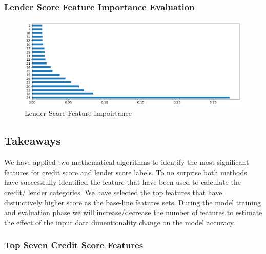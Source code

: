 \hypertarget{lender-score-feature-importance-evaluation}{%
\subsubsection{Lender Score Feature Importance
Evaluation}\label{lender-score-feature-importance-evaluation}}

\begin{Schunk}
\begin{figure}[H]

{\centering \includegraphics[width=1\linewidth]{../../artifacts/lfimportance} 

}

\caption[Lender Score Feature Impoirtance]{Lender Score Feature Impoirtance}\label{fig:lfi}
\end{figure}
\end{Schunk}

\hypertarget{takeaways}{%
\subsection{Takeaways}\label{takeaways}}

We have applied two mathematical algorithms to identify the most
significant features for credit score and lender score labels. To no
surprise both methods have successfully identified the feature that have
been used to calculate the credit/ lender categories. We have selected
the top features that have distinctively higher score as the base-line
features sets. During the model training and evaluation phase we will
increase/decrease the number of features to estimate the effect of the
input data dimentionality change on the model accuracy.

\hypertarget{top-seven-credit-score-features}{%
\subsubsection{Top Seven Credit Score
Features}\label{top-seven-credit-score-features}}

